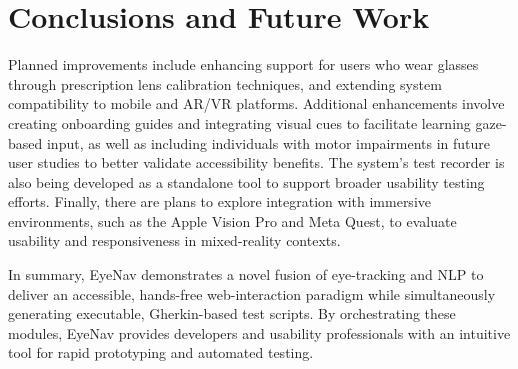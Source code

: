 
\section{Conclusions and Future Work}

Planned improvements include enhancing support for users who wear glasses through prescription lens calibration techniques, and extending system compatibility to mobile and AR/VR platforms. Additional enhancements involve creating onboarding guides and integrating visual cues to facilitate learning gaze-based input, as well as including individuals with motor impairments in future user studies to better validate accessibility benefits. The system's test recorder is also being developed as a standalone tool to support broader usability testing efforts. Finally, there are plans to explore integration with immersive environments, such as the Apple Vision Pro and Meta Quest, to evaluate usability and responsiveness in mixed-reality contexts.

In summary, EyeNav demonstrates a novel fusion of eye-tracking and NLP to deliver an accessible, hands-free web-interaction paradigm while simultaneously generating executable, Gherkin-based test scripts. By orchestrating these modules, EyeNav provides developers and usability professionals with an intuitive tool for rapid prototyping and automated testing. 